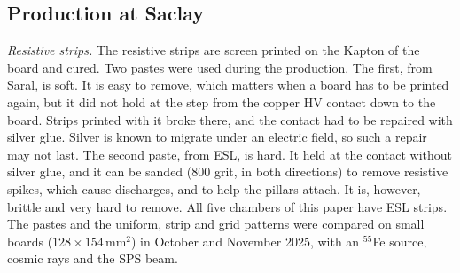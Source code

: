 \subsection{Production at Saclay}\label{app:process}
\emph{Resistive strips.} The resistive strips are screen printed on the Kapton of the board and cured. Two pastes were
used during the production. The first, from Saral, is soft. It is easy to remove, which matters when a board has to be
printed again, but it did not hold at the step from the copper HV contact down to the board. Strips printed with it
broke there, and the contact had to be repaired with silver glue. Silver is known to migrate under an electric field,
so such a repair may not last. The second paste, from ESL, is hard. It held at the contact without silver glue, and it
can be sanded (800 grit, in both directions) to remove resistive spikes, which cause discharges, and to help the
pillars attach. It is, however, brittle and very hard to remove. All five chambers of this paper have ESL strips. The
pastes and the uniform, strip and grid patterns were compared on small boards
($128\times154$\,mm$^2$) in October and November 2025, with an $^{55}$Fe source, cosmic rays and the SPS beam.


